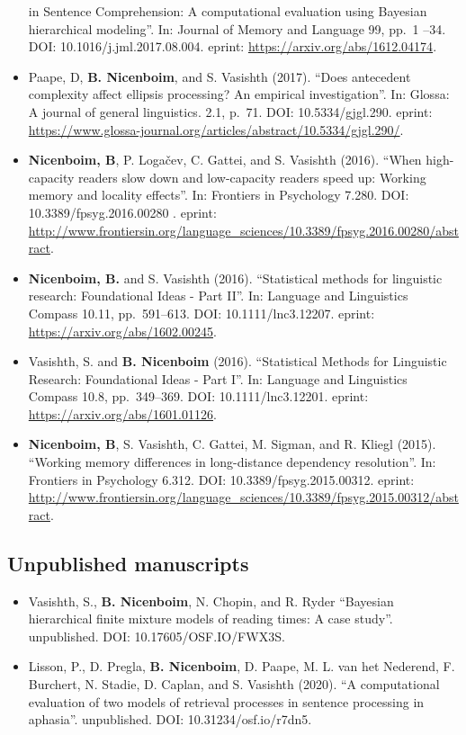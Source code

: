 \documentclass[]{article}
\begin{document}
\begin{itemize}
  in Sentence Comprehension: A computational evaluation using Bayesian
  hierarchical modeling''. In: Journal of Memory and Language 99, pp.~1
  --34. DOI: 10.1016/j.jml.2017.08.004. eprint:
  \url{https://arxiv.org/abs/1612.04174}.
\item
  Paape, D, \textbf{B. Nicenboim}, and S. Vasishth (2017). ``Does
  antecedent complexity affect ellipsis processing? An empirical
  investigation''. In: Glossa: A journal of general linguistics. 2.1,
  p.~71. DOI: 10.5334/gjgl.290. eprint:
  \url{https://www.glossa-journal.org/articles/abstract/10.5334/gjgl.290/}.
\item
  \textbf{Nicenboim, B}, P. Logačev, C. Gattei, and S. Vasishth (2016).
  ``When high-capacity readers slow down and low-capacity readers speed
  up: Working memory and locality effects''. In: Frontiers in Psychology
  7.280. DOI: 10.3389/fpsyg.2016.00280 . eprint:
  \url{http://www.frontiersin.org/language_sciences/10.3389/fpsyg.2016.00280/abstract}.
\item
  \textbf{Nicenboim, B.} and S. Vasishth (2016). ``Statistical methods
  for linguistic research: Foundational Ideas - Part II''. In: Language
  and Linguistics Compass 10.11, pp.~591--613. DOI: 10.1111/lnc3.12207.
  eprint: \url{https://arxiv.org/abs/1602.00245}.
\item
  Vasishth, S. and \textbf{B. Nicenboim} (2016). ``Statistical Methods
  for Linguistic Research: Foundational Ideas - Part I''. In: Language
  and Linguistics Compass 10.8, pp.~349--369. DOI: 10.1111/lnc3.12201.
  eprint: \url{https://arxiv.org/abs/1601.01126}.
\item
  \textbf{Nicenboim, B}, S. Vasishth, C. Gattei, M. Sigman, and R.
  Kliegl (2015). ``Working memory differences in long-distance
  dependency resolution''. In: Frontiers in Psychology 6.312. DOI:
  10.3389/fpsyg.2015.00312. eprint:
  \url{http://www.frontiersin.org/language_sciences/10.3389/fpsyg.2015.00312/abstract}.

   
\end{itemize}

\hypertarget{unpublished-manuscripts}{%
\subsection{Unpublished manuscripts}\label{unpublished-manuscripts}}

\begin{itemize}
\item
  Vasishth, S., \textbf{B. Nicenboim}, N. Chopin, and R. Ryder
  ``Bayesian hierarchical finite mixture models of reading times: A case
  study''. unpublished. DOI: 10.17605/OSF.IO/FWX3S.
\item
  Lisson, P., D. Pregla, \textbf{B. Nicenboim}, D. Paape, M. L. van het
  Nederend, F. Burchert, N. Stadie, D. Caplan, and S. Vasishth (2020).
  ``A computational evaluation of two models of retrieval processes in
  sentence processing in aphasia''. unpublished. DOI:
  10.31234/osf.io/r7dn5.
\end{itemize}
\end{document}
